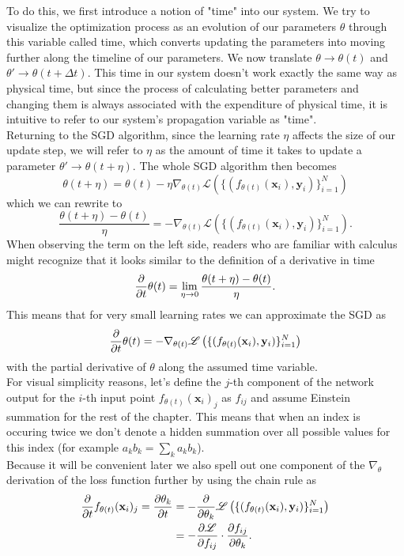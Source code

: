 To do this, we first introduce a notion of "time" into our system. We try to visualize the optimization process as an evolution of our parameters $\theta$ through this variable called time, which converts updating the parameters into moving further along the timeline of our parameters. We now translate $\theta \rightarrow \theta(t)$ and $\theta' \rightarrow \theta(t+\Delta t)$. This time in our system doesn't work exactly the same way as physical time, but since the process of calculating better parameters and changing them is always associated with the expenditure of physical time, it is intuitive to refer to our system's propagation variable as "time". \\
Returning to the SGD algorithm, since the learning rate $\eta$ affects the size of our update step, we will refer to $\eta$ as the amount of time it takes to update a parameter $\theta' \rightarrow \theta(t+\eta)$. The whole SGD algorithm then becomes
\begin{equation}
	\theta(t+\eta) = \theta(t) - \eta \nabla_{\theta(t)} \mathscr{L}\left( \{(f_{\theta(t)}(\mathbf{x}_i), \mathbf{y}_i)\}_{i=1}^{N} \right)
\end{equation}
which we can rewrite to 
\begin{equation}
	\frac{\theta(t+\eta)-\theta(t)}{\eta} = - \nabla_{\theta(t)} \mathscr{L}\left( \{(f_{\theta(t)}(\mathbf{x}_i), \mathbf{y}_i)\}_{i=1}^{N} \right).
\end{equation}
When observing the term on the left side, readers who are familiar with calculus might recognize that it looks similar to the definition of a derivative in time
\begin{equation}
	\frac{\partial}{\partial t}\theta(t) = \lim_{\eta\rightarrow0} \frac{\theta(t+\eta)-\theta(t)}{\eta}.
\end{equation}
This means that for very small learning rates we can approximate the SGD as 
\begin{equation}\label{eq:NTKThetaDerivative}
	\frac{\partial}{\partial t}\theta(t) = - \nabla_{\theta(t)} \mathscr{L}\left( \{(f_{\theta(t)}(\mathbf{x}_i), \mathbf{y}_i)\}_{i=1}^{N} \right)
\end{equation}
with the partial derivative of $\theta$ along the assumed time variable.\\
For visual simplicity reasons, let's define the $j$-th component of the network output for the $i$-th input point $f_{\theta(t)}(\mathbf{x}_i)_j$ as $f_{ij}$ and assume Einstein summation for the rest of the chapter.
This means that when an index is occuring twice we don't denote a hidden summation over all possible values for this index (for example $a_kb_k = \sum_k a_kb_k$).\\
Because it will be convenient later we also spell out one component of the $\nabla_\theta$ derivation of the loss function further by using the chain rule as
\begin{align}
	\frac{\partial}{\partial t}f_{\theta(t)}(\mathbf{x}_i)_j = \frac{\partial\theta_k}{\partial t} &= - \frac{\partial}{\partial\theta_k}\mathscr{L}\left( \{(f_{\theta(t)}(\mathbf{x}_i), \mathbf{y}_i)\}_{i=1}^{N} \right)\nonumber\\
	&= - \frac{\partial\mathscr{L}}{\partial f_{ij}} \cdot \frac{\partial f_{ij}}{\partial\theta_k}.
\end{align} 

